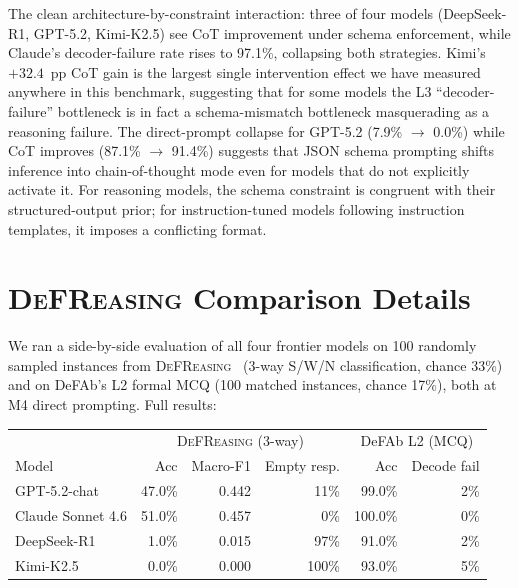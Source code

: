 \documentclass{article}
\theoremstyle{definition}
\begin{document}
The clean architecture-by-constraint interaction: three of four models (DeepSeek-R1, GPT-5.2, Kimi-K2.5) see CoT improvement under schema enforcement, while Claude's decoder-failure rate rises to 97.1\%, collapsing both strategies. Kimi's $+32.4$~pp CoT gain is the largest single intervention effect we have measured anywhere in this benchmark, suggesting that for some models the L3 ``decoder-failure'' bottleneck is in fact a schema-mismatch bottleneck masquerading as a reasoning failure. The direct-prompt collapse for GPT-5.2 (7.9\% $\to$ 0.0\%) while CoT improves (87.1\% $\to$ 91.4\%) suggests that JSON schema prompting shifts inference into chain-of-thought mode even for models that do not explicitly activate it. For reasoning models, the schema constraint is congruent with their structured-output prior; for instruction-tuned models following instruction templates, it imposes a conflicting format.

\section{\textsc{DeFReasing} Comparison Details}\label{app:defreasing}

We ran a side-by-side evaluation of all four frontier models on 100 randomly sampled instances from \textsc{DeFReasing}~\citep{allaway2025defreasing} (3-way S/W/N classification, chance 33\%) and on DeFAb's L2 formal MCQ (100 matched instances, chance 17\%), both at M4 direct prompting. Full results:

\begin{table}[h]
\centering
\small
\begin{tabular}{lrrr|rr}
\toprule
 & \multicolumn{3}{c|}{\textsc{DeFReasing} (3-way)} & \multicolumn{2}{c}{DeFAb L2 (MCQ)} \\
Model & Acc & Macro-F1 & Empty resp. & Acc & Decode fail \\
\midrule
GPT-5.2-chat       & 47.0\% & 0.442 & 11\% & 99.0\% & \phantom{0}2\% \\
Claude Sonnet 4.6  & 51.0\% & 0.457 & \phantom{0}0\% & 100.0\% & \phantom{0}0\% \\
DeepSeek-R1        & \phantom{0}1.0\% & 0.015 & 97\% & 91.0\% & \phantom{0}2\% \\
Kimi-K2.5          & \phantom{0}0.0\% & 0.000 & 100\% & 93.0\% & \phantom{0}5\% \\
\bottomrule
\end{tabular}
\end{table}
\end{document}

